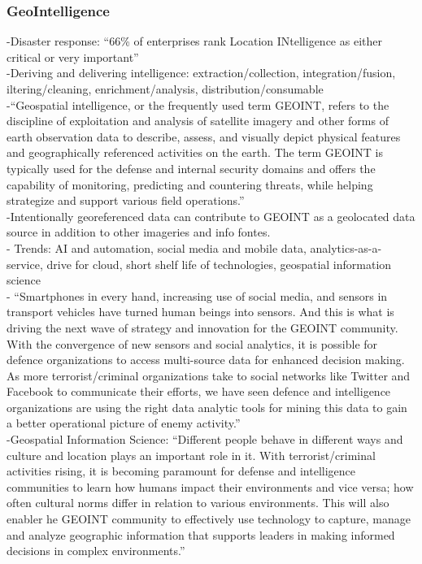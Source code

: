 \subsubsection{GeoIntelligence}
-{\color{orange}Disaster response: “66\% of enterprises rank Location INtelligence as either critical or very important”\cite{Hintz2020}}\\
-{\color{orange}Deriving and delivering intelligence: extraction/collection, integration/fusion, iltering/cleaning, enrichment/analysis, distribution/consumable\cite{Hintz2020}}\\
-{\color{orange}“Geospatial intelligence, or the frequently used term GEOINT, refers to the discipline of exploitation and analysis of satellite imagery and other forms of earth observation data to describe, assess, and visually depict physical features and geographically referenced activities on the earth. The term GEOINT is typically used for the defense and internal security domains and offers the capability of monitoring, predicting and countering threats, while helping strategize and support various field operations.” \cite{Datta2018}}\\
-{\color{purple}Intentionally georeferenced data can contribute to GEOINT as a geolocated data source in addition to other imageries and info fontes.\cite{Datta2018}}\\
-{\color{orange} Trends: AI and automation, social media and mobile data, analytics-as-a-service, drive for cloud, short shelf life of technologies, geospatial information science\cite{Datta2018}}\\
-{\color{orange} “Smartphones in every hand, increasing use of social media, and sensors in transport vehicles have turned human beings into sensors. And this is what is driving the next wave of strategy and innovation for the GEOINT community. With the convergence of new sensors and social analytics, it is possible for defence organizations to access multi-source data for enhanced decision making. As more terrorist/criminal organizations take to social networks like Twitter and Facebook to communicate their efforts, we have seen defence and intelligence organizations are using the right data analytic tools for mining this data to gain a better operational picture of enemy activity.”\cite{Datta2018}}\\
-{\color{orange}Geospatial Information Science: “Different people behave in different ways and culture and location plays an important role in it. With terrorist/criminal activities rising, it is becoming paramount for defense and intelligence communities to learn how humans impact their environments and vice versa; how often cultural norms differ in relation to various environments. This will also enabler he GEOINT community to effectively use technology to capture, manage and analyze geographic information that supports leaders in making informed decisions in complex environments.”\cite{Datta2018}}\\
